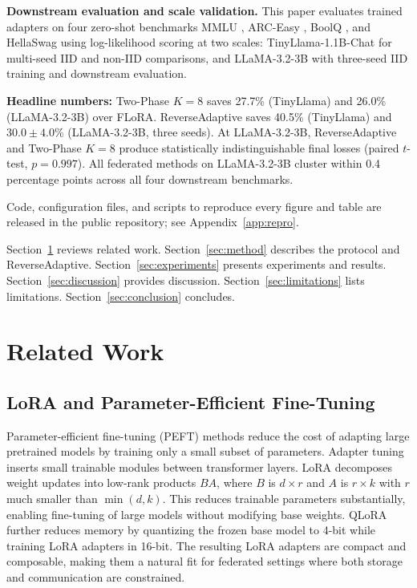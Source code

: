 \textbf{Downstream evaluation and scale validation.}
This paper evaluates trained adapters on four zero-shot benchmarks MMLU \citep{hendrycks2020measuring}, ARC-Easy \citep{clark2018arc}, BoolQ \citep{clark2019boolq}, and HellaSwag \citep{zellers2019hellaswag} using log-likelihood scoring at two scales: TinyLlama-1.1B-Chat \citep{zhang2024tinyllama} for multi-seed IID and non-IID comparisons, and LLaMA-3.2-3B \citep{dubey2024llama3} with three-seed IID training and downstream evaluation.

\textbf{Headline numbers:}
Two-Phase $K{=}8$ saves 27.7\% (TinyLlama) and 26.0\% (LLaMA-3.2-3B) over FLoRA. ReverseAdaptive saves 40.5\% (TinyLlama) and $30.0 \pm 4.0$\% (LLaMA-3.2-3B, three seeds). At LLaMA-3.2-3B, ReverseAdaptive and Two-Phase $K{=}8$ produce statistically indistinguishable final losses (paired $t$-test, $p = 0.997$). All federated methods on LLaMA-3.2-3B cluster within 0.4 percentage points across all four downstream benchmarks.

Code, configuration files, and scripts to reproduce every figure and table are released in the public repository; see Appendix~\ref{app:repro}.

Section~\ref{sec:related} reviews related work. Section~\ref{sec:method} describes the protocol and ReverseAdaptive. Section~\ref{sec:experiments} presents experiments and results. Section~\ref{sec:discussion} provides discussion. Section~\ref{sec:limitations} lists limitations. Section~\ref{sec:conclusion} concludes.

\section{Related Work}
\label{sec:related}

\subsection{LoRA and Parameter-Efficient Fine-Tuning}
Parameter-efficient fine-tuning (PEFT) methods reduce the cost of adapting large pretrained models by training only a small subset of parameters. Adapter tuning \citep{houlsby2019parameter} inserts small trainable modules between transformer layers. LoRA \citep{hu2022lora} decomposes weight updates into low-rank products $BA$, where $B$ is $d \times r$ and $A$ is $r \times k$ with $r$ much smaller than $\min(d,k)$. This reduces trainable parameters substantially, enabling fine-tuning of large models without modifying base weights. QLoRA \citep{dettmers2023qlora} further reduces memory by quantizing the frozen base model to 4-bit while training LoRA adapters in 16-bit. The resulting LoRA adapters are compact and composable, making them a natural fit for federated settings where both storage and communication are constrained.


